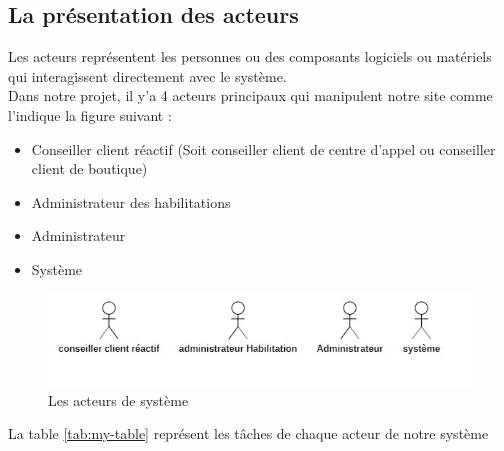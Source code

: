 \subsection[La présentation des acteurs ]{La présentation des acteurs }
Les acteurs représentent les personnes ou des composants logiciels ou matériels qui interagissent directement avec le système.\\
Dans notre projet, il y’a 4 acteurs principaux qui manipulent notre site comme l'indique la figure suivant :
\begin{itemize}
	\item Conseiller client réactif (Soit conseiller client de centre d’appel ou conseiller client de boutique)
	\item Administrateur des habilitations
	\item Administrateur
	\item Système
\end{itemize}
\begin{figure}[tbph]
	\centering
	\includegraphics[width=0.7\linewidth]{img/conception/usecases/actors}
	\caption[Les acteurs de système]{Les acteurs de système}
	\label{fig:actors}
\end{figure}
\newpage
La table \ref{tab:my-table} représent les tâches de chaque acteur de notre système
